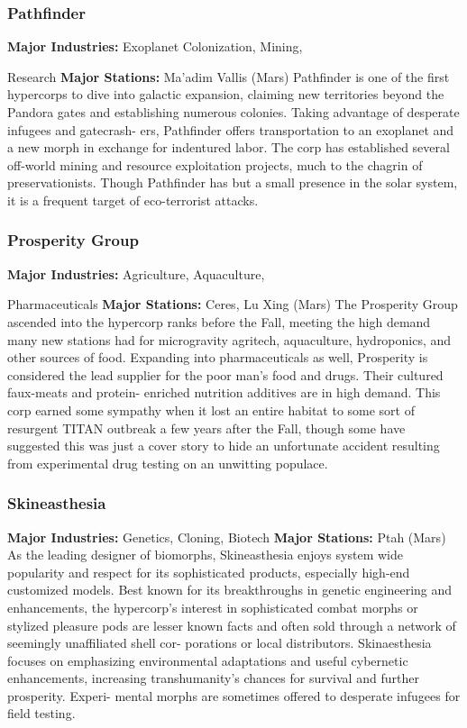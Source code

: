 \subsubsection{Pathfinder}

\textbf{Major Industries:} Exoplanet Colonization, Mining, 

Research
\textbf{Major Stations:} Ma'adim Vallis (Mars)
Pathfinder is one of the first hypercorps to dive into 
galactic expansion, claiming new territories beyond 
the Pandora gates and establishing numerous colonies. 
Taking advantage of desperate infugees and gatecrash-
ers, Pathfinder offers transportation to an exoplanet 
and a new morph in exchange for indentured labor. 
The corp has established several off-world mining and 
resource exploitation projects, much to the chagrin of 
preservationists. Though Pathfinder has but a small 
presence in the solar system, it is a frequent target of 
eco-terrorist attacks.

\subsubsection{Prosperity Group}

\textbf{Major Industries:} Agriculture, Aquaculture, 

Pharmaceuticals
\textbf{Major Stations:} Ceres, Lu Xing (Mars)
The Prosperity Group ascended into the hypercorp 
ranks before the Fall, meeting the high demand 
many new stations had for microgravity agritech, 
aquaculture, hydroponics, and other sources of food. 
Expanding into pharmaceuticals as well, Prosperity is 
considered the lead supplier for the poor man's food 
and drugs. Their cultured faux-meats and protein-
enriched nutrition additives are in high demand. This 
corp earned some sympathy when it lost an entire 
habitat to some sort of resurgent TITAN outbreak a 
few years after the Fall, though some have suggested 
this was just a cover story to hide an unfortunate 
accident resulting from experimental drug testing on 
an unwitting populace.

\subsubsection{Skineasthesia}

\textbf{Major Industries:} Genetics, Cloning, Biotech
\textbf{Major Stations:} Ptah (Mars)
As the leading designer of biomorphs, Skineasthesia 
enjoys system wide popularity and respect for its 
sophisticated products, especially high-end customized 
models. Best known for its breakthroughs in genetic 
engineering and enhancements, the hypercorp's 
interest in sophisticated combat morphs or stylized 
pleasure pods are lesser known facts and often sold 
through a network of seemingly unaffiliated shell cor-
porations or local distributors. Skinaesthesia focuses 
on emphasizing environmental adaptations and useful 
cybernetic enhancements, increasing transhumanity's 
chances for survival and further prosperity. Experi-
mental morphs are sometimes offered to desperate 
infugees for field testing.

